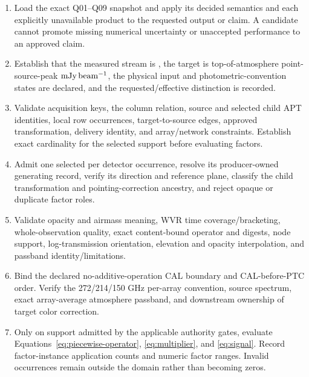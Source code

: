 \documentclass[10pt]{article}
\begin{document}
\begin{enumerate}[label=\textbf{E\arabic*.},leftmargin=*]
\item {} Load the exact Q01--Q09 snapshot and
  apply its decided semantics and each explicitly unavailable product to the
  requested output or claim. A candidate cannot promote missing numerical
  uncertainty or unaccepted performance to an approved claim.

\item {} Establish that the measured stream is
  , the target is top-of-atmosphere point-source-peak
  \(\mathrm{mJy\,beam^{-1}}\), the physical input and photometric-convention states are
  declared, and the requested/effective distinction is recorded.

\item {} Validate acquisition keys, the
  column relation, source and selected child APT identities, local row
  occurrences, target-to-source edges, approved transformation, delivery
  identity, and array/network constraints. Establish exact cardinality for
  the selected support before evaluating factors.

\item {} Admit one selected  per
  detector occurrence, resolve its producer-owned generating record, verify
  its direction and reference plane, classify the child transformation and
  pointing-correction ancestry, and reject opaque or duplicate factor roles.

\item {} Validate opacity and airmass meaning,
  WVR time coverage/bracketing, whole-observation quality, exact content-bound
  operator and digests, node support, log-transmission orientation, elevation
  and opacity interpolation, and passband identity/limitations.

\item {} Bind the declared
  no-additive-operation CAL boundary and CAL-before-PTC order. Verify the
  272/214/150 GHz per-array convention, source spectrum, exact array-average
  atmosphere passband, and downstream ownership of target color correction.

\item {} Only on support admitted by the applicable
  authority gates, evaluate
  Equations~\eqref{eq:piecewise-operator}, \eqref{eq:multiplier}, and
  \eqref{eq:signal}. Record factor-instance application counts and numeric
  factor ranges. Invalid occurrences remain outside the domain rather than
  becoming zeros.


\end{enumerate}
\end{document}
